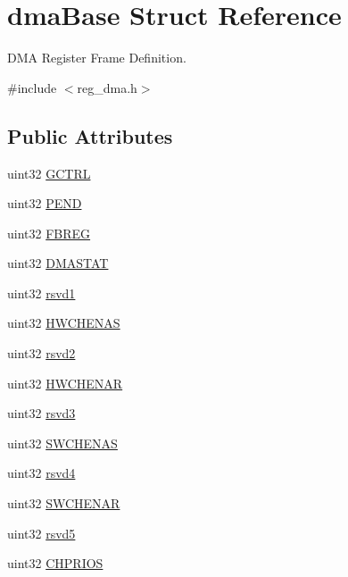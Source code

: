 \hypertarget{structdmaBase}{}\section{dma\+Base Struct Reference}
\label{structdmaBase}


D\+MA Register Frame Definition.  




{\ttfamily \#include $<$reg\+\_\+dma.\+h$>$}

\subsection*{Public Attributes}
\begin{DoxyCompactItemize}
\item 
uint32 \mbox{\hyperlink{structdmaBase_a0c963aeeac54209e04b6ab92ba7bb3eb}{G\+C\+T\+RL}}
\item 
uint32 \mbox{\hyperlink{structdmaBase_ac6cfb5425326d4d66114cf22b25ba0b0}{P\+E\+ND}}
\item 
uint32 \mbox{\hyperlink{structdmaBase_a7ef7be833a8414c4cdfb86b82032183b}{F\+B\+R\+EG}}
\item 
uint32 \mbox{\hyperlink{structdmaBase_a66e0413e244f88ed9659e1df26b039ef}{D\+M\+A\+S\+T\+AT}}
\item 
uint32 \mbox{\hyperlink{structdmaBase_a92ed871763abf5e41bb6f897153a0661}{rsvd1}}
\item 
uint32 \mbox{\hyperlink{structdmaBase_ad7486c78d882f79753f38089a47d68d6}{H\+W\+C\+H\+E\+N\+AS}}
\item 
uint32 \mbox{\hyperlink{structdmaBase_a8226f5c62641386056dfb058f397108a}{rsvd2}}
\item 
uint32 \mbox{\hyperlink{structdmaBase_ab8cd74d5174a8e1b353c2eb6fc499b64}{H\+W\+C\+H\+E\+N\+AR}}
\item 
uint32 \mbox{\hyperlink{structdmaBase_acaf5fca5868db723b05d92787d204de4}{rsvd3}}
\item 
uint32 \mbox{\hyperlink{structdmaBase_aa930ff1a2548fb70d8745c624b6bc1c0}{S\+W\+C\+H\+E\+N\+AS}}
\item 
uint32 \mbox{\hyperlink{structdmaBase_a3c3cee1790a17eb51175ed8f39865e98}{rsvd4}}
\item 
uint32 \mbox{\hyperlink{structdmaBase_adb2be1c8668fa06676ea38d8e9fda7db}{S\+W\+C\+H\+E\+N\+AR}}
\item 
uint32 \mbox{\hyperlink{structdmaBase_a87b68adeeb0bcbe8f2c95a7fb57ae053}{rsvd5}}
\item 
uint32 \mbox{\hyperlink{structdmaBase_a6e640cccc2de459d2c335f421ac8fa5b}{C\+H\+P\+R\+I\+OS}}

\end{DoxyCompactItemize}
